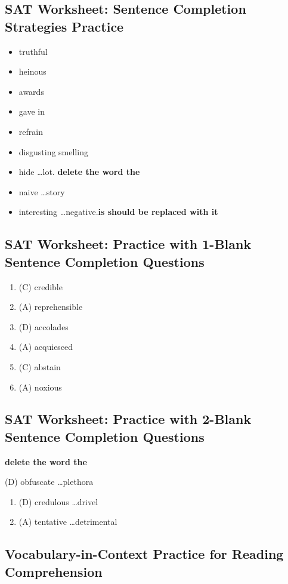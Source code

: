 \begin{enumerate}
\subsection{SAT Worksheet: Sentence Completion Strategies Practice}

\begin{itemize}
\item truthful
\item heinous
\item awards
\item gave in
\item refrain
\item disgusting smelling
\item hide \ldots lot. \textbf{delete the word the}
\item naive \ldots story
\item interesting \ldots negative.\textbf{is should be replaced with it} 
\end{itemize}

\subsection{SAT Worksheet: Practice with 1-Blank Sentence Completion Questions}

\begin{enumerate}
\item (C) credible
\item (A) reprehensible
\item (D) accolades
\item (A) acquiesced
\item (C) abstain
\item (A) noxious
\end{enumerate}

\subsection{SAT Worksheet: Practice with 2-Blank Sentence Completion Questions}

\bigskip
\textbf{delete the word the}

\bigskip
(D) obfuscate \ldots plethora

\begin{enumerate}
\item (D) credulous \ldots drivel
\item (A) tentative \ldots detrimental
\end{enumerate}

\subsection{Vocabulary-in-Context Practice for Reading Comprehension}


\end{enumerate}
